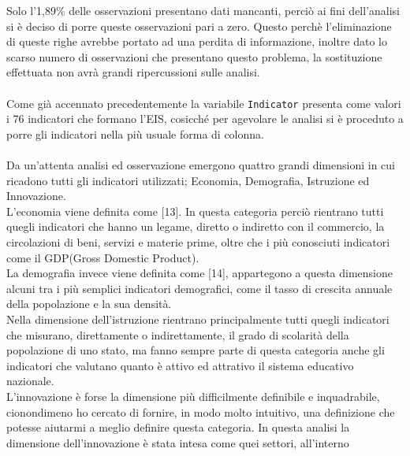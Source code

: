 \documentclass[a4paper,12pt, openright]{report}
\begin{document}
Solo l'1,89\% delle osservazioni presentano dati mancanti, perciò ai fini dell'analisi si è deciso di porre queste osservazioni pari a zero. 
Questo perchè l'eliminazione di queste righe
avrebbe portato ad una perdita di informazione, inoltre dato lo scarso numero di osservazioni che presentano questo problema, 
la sostituzione effettuata non 
avrà grandi ripercussioni sulle analisi. \\
\\
Come già accennato precedentemente la variabile \texttt{Indicator} presenta come valori i 76 indicatori che formano l'EIS, cosicché 
per agevolare le 
analisi si è proceduto a porre gli indicatori nella più usuale forma di colonna. \\
\\
Da un'attenta analisi ed osservazione emergono quattro grandi dimensioni in cui ricadono tutti gli indicatori utilizzati; Economia, Demografia, 
Istruzione ed Innovazione. \\
L'economia viene definita come [13]. In questa categoria perciò rientrano tutti quegli indicatori che hanno un legame, diretto o 
indiretto con il commercio, la circolazioni di beni, servizi e materie prime, oltre che i più conosciuti indicatori come il GDP(Gross Domestic Product). \\
La demografia invece viene definita come [14], appartegono a questa dimensione alcuni tra i più semplici indicatori demografici, come il tasso di crescita 
annuale della popolazione e la sua densità. \\
Nella dimensione dell'istruzione rientrano principalmente tutti quegli indicatori che misurano, direttamente o indirettamente, il grado di scolarità della 
popolazione di uno stato, ma fanno sempre parte di questa categoria anche gli indicatori che valutano quanto è attivo ed attrativo il sistema educativo nazionale. \\
L'innovazione è forse la dimensione più difficilmente definibile e inquadrabile, cionondimeno ho cercato di fornire, in modo molto intuitivo, una 
definizione che potesse aiutarmi a meglio definire questa categoria. In questa analisi la dimensione dell'innovazione è stata intesa come quei settori, all'interno
\end{document}
